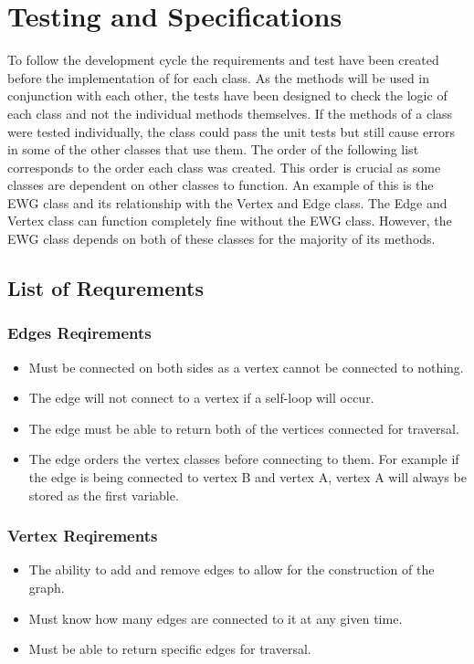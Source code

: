 \documentclass{AISB2008}
\begin{document}
\section{Testing and Specifications}
To follow the development cycle the requirements and test have been created before the implementation of for each class. As the methods will be used in conjunction with each other, the tests have been designed to check the logic of each class and not the individual methods themselves. If the methods of a class were tested individually, the class could pass the unit tests but still cause errors in some of the other classes that use them.
The order of the following list corresponds to the order each class was created. This order is crucial as some classes are dependent on other classes to function. An example of this is the EWG class and its relationship with the Vertex and Edge class. The Edge and Vertex class can function completely fine without the EWG class. However, the EWG class depends on both of these classes for the majority of its methods.

\subsection{List of Requrements}

\subsubsection{Edges Reqirements}

\begin{itemize}
\item Must be connected on both sides as a vertex cannot be connected to nothing.
\item The edge will not connect to a vertex if a self-loop will occur.
\item The edge must be able to return both of the vertices connected for traversal.
\item The edge orders the vertex classes before connecting to them. For example if the edge is being connected to vertex B and vertex A, vertex A will always be stored as the first variable.
\end{itemize}


\subsubsection{Vertex Reqirements}

\begin{itemize}
\item The ability to add and remove edges to allow for the construction of the graph.
\item Must know how many edges are connected to it at any given time.
\item Must be able to return specific edges for traversal.
\end{itemize}
\end{document}
